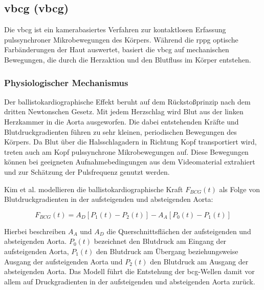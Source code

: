 \subsection{\acl{vbcg} (\acs{vbcg})}
\label{subsec:vbcg}
Die \ac{vbcg} ist ein kamerabasiertes Verfahren zur kontaktlosen Erfassung pulssynchroner Mikrobewegungen des Körpers. Während die \ac{rppg} optische Farbänderungen der Haut auswertet, basiert die \ac{vbcg} auf mechanischen Bewegungen, die durch die Herzaktion und den Blutfluss im Körper entstehen.

\subsubsection{Physiologischer Mechanismus}
Der ballistokardiographische Effekt beruht auf dem Rückstoßprinzip nach dem dritten Newtonschen Gesetz. Mit jedem Herzschlag wird Blut aus der linken Herzkammer in die Aorta ausgeworfen. Die dabei entstehenden Kräfte und Blutdruckgradienten führen zu sehr kleinen, periodischen Bewegungen des Körpers. Da Blut über die Halsschlagadern in Richtung Kopf transportiert wird, treten auch am Kopf pulssynchrone Mikrobewegungen auf. Diese Bewegungen können bei geeigneten Aufnahmebedingungen aus dem Videomaterial extrahiert und zur Schätzung der Pulsfrequenz genutzt werden.

Kim et al. modellieren die ballistokardiographische Kraft $F_{BCG}(t)$ als Folge von Blutdruckgradienten in der aufsteigenden und absteigenden Aorta:

\begin{equation}
F_{BCG}(t) = A_D[P_1(t) - P_2(t)] - A_A[P_0(t) - P_1(t)]
\end{equation}

Hierbei beschreiben $A_A$ und $A_D$ die Querschnittsflächen der aufsteigenden und absteigenden Aorta. $P_0(t)$ bezeichnet den Blutdruck am Eingang der aufsteigenden Aorta, $P_1(t)$ den Blutdruck am Übergang beziehungsweise Ausgang der aufsteigenden Aorta und $P_2(t)$ den Blutdruck am Ausgang der absteigenden Aorta. Das Modell führt die Entstehung der \ac{bcg}-Wellen damit vor allem auf Druckgradienten in der aufsteigenden und absteigenden Aorta zurück.

